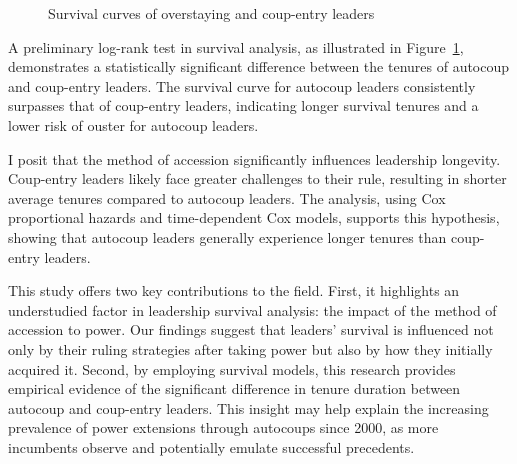 \documentclass[
  12pt,
]{report}
\begin{document}
\begin{figure}


\caption{\label{fig-logrank}Survival curves of overstaying and
coup-entry leaders}

\end{figure}%

A preliminary log-rank test in survival analysis, as illustrated in
Figure~\ref{fig-logrank}, demonstrates a statistically significant
difference between the tenures of autocoup and coup-entry leaders. The
survival curve for autocoup leaders consistently surpasses that of
coup-entry leaders, indicating longer survival tenures and a lower risk
of ouster for autocoup leaders.

I posit that the method of accession significantly influences leadership
longevity. Coup-entry leaders likely face greater challenges to their
rule, resulting in shorter average tenures compared to autocoup leaders.
The analysis, using Cox proportional hazards and time-dependent Cox
models, supports this hypothesis, showing that autocoup leaders
generally experience longer tenures than coup-entry leaders.

This study offers two key contributions to the field. First, it
highlights an understudied factor in leadership survival analysis: the
impact of the method of accession to power. Our findings suggest that
leaders' survival is influenced not only by their ruling strategies
after taking power but also by how they initially acquired it. Second,
by employing survival models, this research provides empirical evidence
of the significant difference in tenure duration between autocoup and
coup-entry leaders. This insight may help explain the increasing
prevalence of power extensions through autocoups since 2000, as more
incumbents observe and potentially emulate successful precedents.
\end{document}
